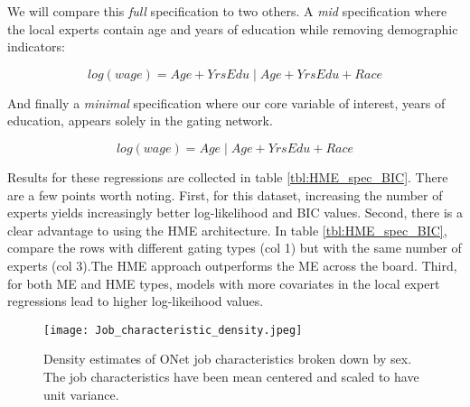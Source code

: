 \documentclass[12pt]{article}
\begin{document}
We will compare this \textit{full} specification to two others. A
\textit{mid} specification where the local experts contain age and
years of education while removing demographic indicators:

\begin{equation}
  log(wage) = Age + YrsEdu \; | \; Age + YrsEdu + Race
\end{equation}

And finally a \textit{minimal} specification where our core variable
of interest, years of education, appears solely in the gating network.

\begin{equation}
  log(wage) = Age \; | \; Age + YrsEdu + Race
\end{equation}

Results for these regressions are collected in table \ref{tbl:HME_spec_BIC}.
There are a few points worth noting. First, for this dataset, increasing the
number of experts yields increasingly better log-likelihood and BIC values.
Second, there is a clear advantage to using the HME architecture. In table
\ref{tbl:HME_spec_BIC}, compare the rows with different gating types (col 1)
but with the same number of experts (col 3).The HME approach outperforms the
ME across the board. Third, for both ME and HME types, models with more
covariates in the local expert regressions lead to higher log-likeihood
values. 

\begin{figure}[!ht]
  \texttt{[image: Job\_characteristic\_density.jpeg]}
  \caption{Density estimates of ONet job characteristics broken down by
  sex. The job characteristics have been mean centered and scaled to
  have unit variance.}
  \label{fig:JobChar_vs_sex}
\end{figure}
\end{document}
